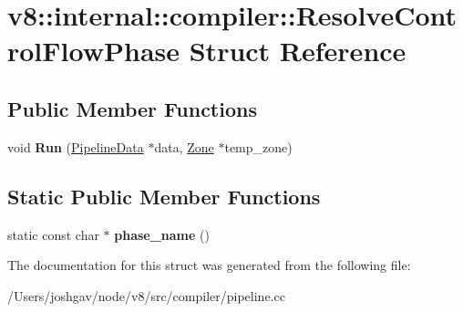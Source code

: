 \hypertarget{structv8_1_1internal_1_1compiler_1_1_resolve_control_flow_phase}{}\section{v8\+:\+:internal\+:\+:compiler\+:\+:Resolve\+Control\+Flow\+Phase Struct Reference}
\label{structv8_1_1internal_1_1compiler_1_1_resolve_control_flow_phase}
\subsection*{Public Member Functions}
\begin{DoxyCompactItemize}
\item 
void {\bfseries Run} (\hyperlink{classv8_1_1internal_1_1compiler_1_1_pipeline_data}{Pipeline\+Data} $\ast$data, \hyperlink{classv8_1_1internal_1_1_zone}{Zone} $\ast$temp\+\_\+zone)\hypertarget{structv8_1_1internal_1_1compiler_1_1_resolve_control_flow_phase_a764168fafa6d8140b197cc149b2ff5f5}{}\label{structv8_1_1internal_1_1compiler_1_1_resolve_control_flow_phase_a764168fafa6d8140b197cc149b2ff5f5}

\end{DoxyCompactItemize}
\subsection*{Static Public Member Functions}
\begin{DoxyCompactItemize}
\item 
static const char $\ast$ {\bfseries phase\+\_\+name} ()\hypertarget{structv8_1_1internal_1_1compiler_1_1_resolve_control_flow_phase_a07eebe867df1611a42b7b3fef49ed5bd}{}\label{structv8_1_1internal_1_1compiler_1_1_resolve_control_flow_phase_a07eebe867df1611a42b7b3fef49ed5bd}

\end{DoxyCompactItemize}


The documentation for this struct was generated from the following file\+:\begin{DoxyCompactItemize}
\item 
/\+Users/joshgav/node/v8/src/compiler/pipeline.\+cc\end{DoxyCompactItemize}
